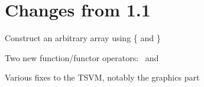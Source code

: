 \chapter{Changes from 1.1}

\begin{itemlist}
\item Construct an arbitrary array using \{ and \}
\item Two new function/functor operators: \basicseqapp\ and \basicinfixmap
\item Various fixes to the TSVM, notably the graphics part
\end{itemlist}
